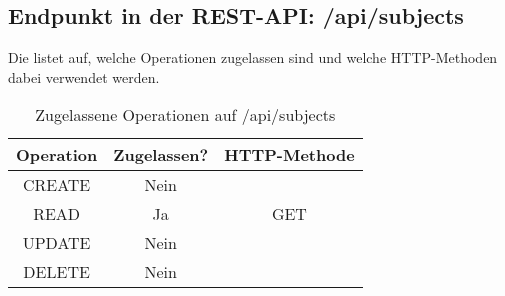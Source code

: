 \subsection{Endpunkt in der REST-API: /api/subjects}
\label{sec:end:rest:api:subjects}
Die  listet auf, welche Operationen zugelassen sind und welche HTTP-Methoden dabei verwendet werden. 

\begin{table}[!htbp]
	\begin{tabular}{|c|c|c|}
		\hline
			\textbf{Operation} & \textbf{Zugelassen?} & \textbf{HTTP-Methode} \\ \hline
			CREATE & Nein &  \\ \hline 
			READ & Ja & GET \\ \hline
			UPDATE & Nein & \\ \hline 
			DELETE & Nein & \\ \hline
	\end{tabular}

		\caption{Zugelassene Operationen auf /api/subjects}
		\label{tab:end:rest:api:subjects:meth}
\end{table}

